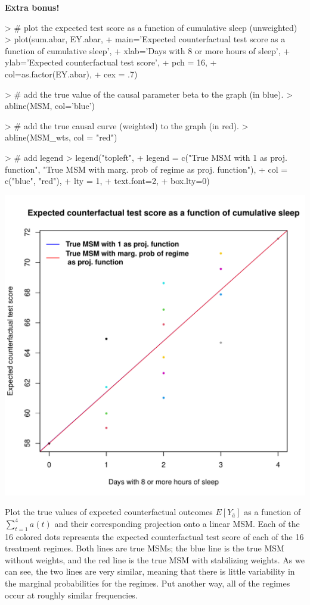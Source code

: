 \documentclass[answers]{exam}
\newenvironment{myfigure}{\captionsetup{type=mytype}}{}
\begin{document}
\begin{solution}
\textbf{Extra bonus!}



\begin{Schunk}
\begin{Sinput}
> # plot the expected test score as a function of cumulative sleep (unweighted)
> plot(sum.abar, EY.abar,
+      main='Expected counterfactual test score as a function of cumulative sleep',
+      xlab='Days with 8 or more hours of sleep',
+      ylab='Expected counterfactual test score',
+      pch = 16,
+      col=as.factor(EY.abar),
+      cex = .7)
\end{Sinput}
\end{Schunk}
\begin{Schunk}
\begin{Sinput}
> # add the true value of the causal parameter beta to the graph (in blue).
> abline(MSM, col='blue')
\end{Sinput}
\end{Schunk}
\begin{Schunk}
\begin{Sinput}
> # add the true causal curve (weighted) to the graph (in red).
> abline(MSM_wts, col = "red")
\end{Sinput}
\end{Schunk}
\begin{Schunk}
\begin{Sinput}
> # add legend
> legend("topleft",
+        legend = c("True MSM with 1 as proj. function", "True MSM with marg. prob of regime \n as proj. function"),
+        col = c("blue", "red"),
+        lty = 1,
+        text.font=2,
+        box.lty=0)
\end{Sinput}
\end{Schunk}

\begin{myfigure}
\begin{center}
\includegraphics[width=.4\textwidth]{MSM.pdf}
\caption{Plot the true values of expected counterfactual outcomes $E[Y_{\bar{a}}]$ as a function of $\sum_{t = 1}^4 a(t)$ and their corresponding projection onto a linear MSM.  Each of the 16 colored dots represents the expected counterfactual test score of each of the 16 treatment regimes. Both lines are true MSMs; the blue line is the true MSM without weights, and the red line is the true MSM with stabilizing weights. As we can see, the two lines are very similar, meaning that there is little variability in the marginal probabilities for the regimes. Put another way, all of the regimes occur at roughly similar frequencies.
}
\label{Fig:MSM}
\end{center}
\end{myfigure}
\end{solution}
\end{document}
